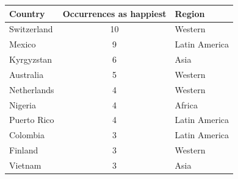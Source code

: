\begin{tabular}{lcl}
\toprule
Country & Occurrences as happiest & Region \\
\midrule
Switzerland & 10 & Western \\
Mexico & 9 & Latin America \\
Kyrgyzstan & 6 & Asia \\
Australia & 5 & Western \\
Netherlands & 4 & Western \\
Nigeria & 4 & Africa \\
Puerto Rico & 4 & Latin America \\
Colombia & 3 & Latin America \\
Finland & 3 & Western \\
Vietnam & 3 & Asia \\
\bottomrule
\end{tabular}

